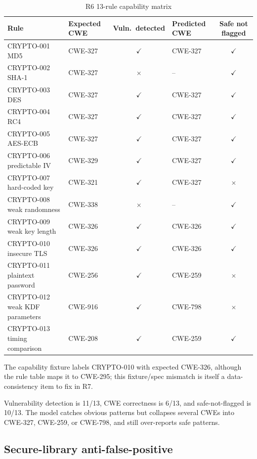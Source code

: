 \documentclass[11pt]{article}
\newcommand{\good}{\textcolor{green!50!black}{$\checkmark$}}
\newcommand{\bad}{\textcolor{red!70!black}{$\times$}}
\begin{document}
\begin{table}[h]
\centering
\caption{R6 13-rule capability matrix}
\label{tab:r6-capability-en}
\small
\begin{tabularx}{\linewidth}{L{2.1cm}L{2.0cm}cL{1.9cm}c}
\toprule
\textbf{Rule} & \textbf{Expected CWE} & \textbf{Vuln.\ detected} & \textbf{Predicted CWE} & \textbf{Safe not flagged} \\
\midrule
CRYPTO-001 MD5 & CWE-327 & \good & CWE-327 & \good \\
CRYPTO-002 SHA-1 & CWE-327 & \bad & -- & \good \\
CRYPTO-003 DES & CWE-327 & \good & CWE-327 & \good \\
CRYPTO-004 RC4 & CWE-327 & \good & CWE-327 & \good \\
CRYPTO-005 AES-ECB & CWE-327 & \good & CWE-327 & \good \\
CRYPTO-006 predictable IV & CWE-329 & \good & CWE-327 & \good \\
CRYPTO-007 hard-coded key & CWE-321 & \good & CWE-327 & \bad \\
CRYPTO-008 weak randomness & CWE-338 & \bad & -- & \good \\
CRYPTO-009 weak key length & CWE-326 & \good & CWE-326 & \good \\
CRYPTO-010 insecure TLS & CWE-326 & \good & CWE-326 & \good \\
CRYPTO-011 plaintext password & CWE-256 & \good & CWE-259 & \bad \\
CRYPTO-012 weak KDF parameters & CWE-916 & \good & CWE-798 & \bad \\
CRYPTO-013 timing comparison & CWE-208 & \good & CWE-259 & \good \\
\bottomrule
\end{tabularx}
\smallskip
{\footnotesize The capability fixture labels CRYPTO-010 with expected CWE-326, although the rule table maps it
to CWE-295; this fixture/spec mismatch is itself a data-consistency item to fix in R7.}
\end{table}

Vulnerability detection is 11/13, CWE correctness is 6/13, and safe-not-flagged is 10/13. The model catches
obvious patterns but collapses several CWEs into CWE-327, CWE-259, or CWE-798, and still over-reports safe
patterns.

\subsection{Secure-library anti-false-positive}
\end{document}
